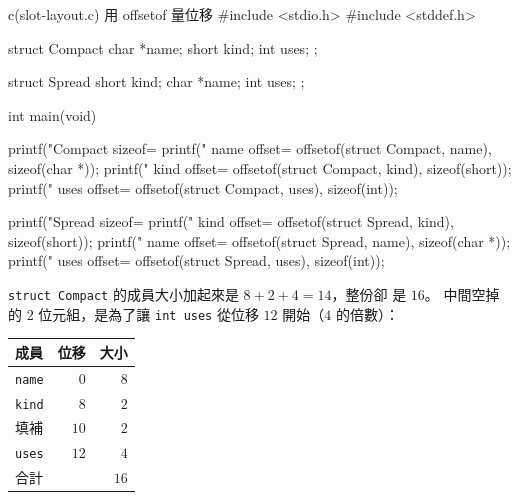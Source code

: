 \begin{example}{c}{(slot-layout.c) 用 offsetof 量位移}
#include <stdio.h>
#include <stddef.h>

struct Compact {
    char *name;
    short kind;
    int uses;
};

struct Spread {
    short kind;
    char *name;
    int uses;
};

int main(void) {
    printf("Compact sizeof=%
    printf("  name offset=%
           offsetof(struct Compact, name), sizeof(char *));
    printf("  kind offset=%
           offsetof(struct Compact, kind), sizeof(short));
    printf("  uses offset=%
           offsetof(struct Compact, uses), sizeof(int));

    printf("Spread sizeof=%
    printf("  kind offset=%
           offsetof(struct Spread, kind), sizeof(short));
    printf("  name offset=%
           offsetof(struct Spread, name), sizeof(char *));
    printf("  uses offset=%
           offsetof(struct Spread, uses), sizeof(int));
}
\end{example}


\texttt{struct Compact} 的成員大小加起來是 $8 + 2 + 4 = 14$，整份卻
是 $16$。 中間空掉的 $2$ 位元組，是為了讓 \texttt{int uses} 從位移
$12$ 開始（$4$ 的倍數）：

\begin{center}
\begin{tabular}{|l|r|r|}
\hline
\textbf{成員} & \textbf{位移} & \textbf{大小} \\
\hline
\texttt{name} & $0$ & $8$ \\
\texttt{kind} & $8$ & $2$ \\
填補 & $10$ & $2$ \\
\texttt{uses} & $12$ & $4$ \\
\hline
合計 &  & $16$ \\
\hline
\end{tabular}
\end{center}

